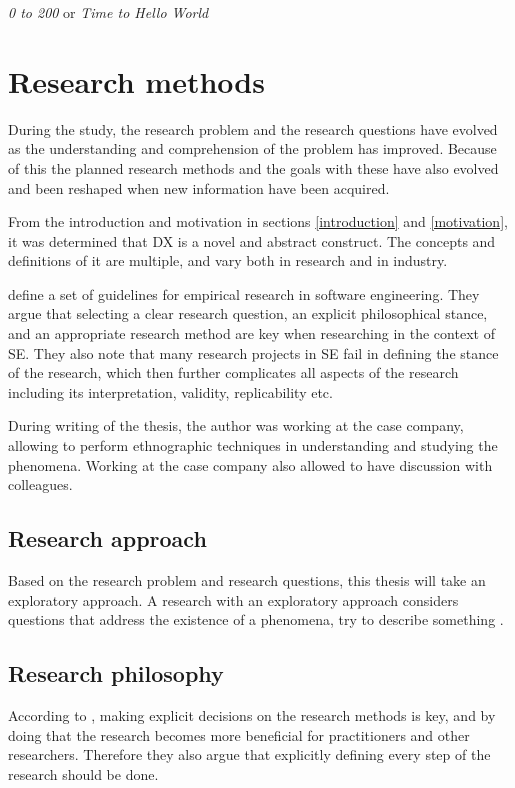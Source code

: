 \documentclass[english, 12pt, a4paper, sci, utf8, a-1b, online]{aaltothesis}
\begin{document}
\textit{0 to 200} or \textit{Time to Hello World}

\clearpage
\section{Research methods}

During the study, the research problem and the research questions have evolved as the understanding and comprehension of the problem has improved. Because of this the planned research methods and the goals with these have also evolved and been reshaped when new information have been acquired.

From the introduction and motivation in sections \ref{introduction} and \ref{motivation}, it was determined that DX is a novel and abstract construct. The concepts and definitions of it are multiple, and vary both in research and in industry.

\cite{easterbrook2008selecting} define a set of guidelines for empirical research in software engineering. They argue that selecting a clear research question, an explicit philosophical stance, and an appropriate research method are key when researching in the context of SE. They also note that many research projects in SE fail in defining the stance of the research, which then further complicates all aspects of the research including its interpretation, validity, replicability etc.

During writing of the thesis, the author was working at the case company, allowing to perform ethnographic techniques in understanding and studying the phenomena. Working at the case company also allowed to have discussion with colleagues.    

\subsection{Research approach}

Based on the research problem and research questions, this thesis will take an exploratory approach. A research with an exploratory approach considers questions that address the existence of a phenomena, try to describe something \citep{easterbrook2008selecting}.

\subsection{Research philosophy}

According to \cite{easterbrook2008selecting}, making explicit decisions on the research methods is key, and by doing that the research becomes more beneficial for practitioners and other researchers. Therefore they also argue that explicitly defining every step of the research should be done.
\end{document}
